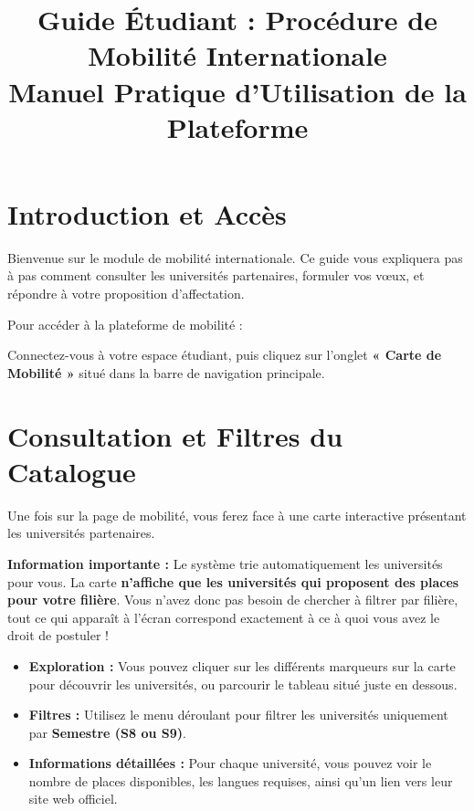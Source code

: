 \documentclass[12pt,a4paper]{article}
\title{\textbf{Guide Étudiant : Procédure de Mobilité Internationale}\\ \large Manuel Pratique d'Utilisation de la Plateforme}
\begin{document}
\maketitle
\tableofcontents
\newpage

\section{Introduction et Accès}
Bienvenue sur le module de mobilité internationale. Ce guide vous expliquera pas à pas comment consulter les universités partenaires, formuler vos vœux, et répondre à votre proposition d'affectation.

Pour accéder à la plateforme de mobilité :
\begin{tcolorbox}[colback=blue!5!white,colframe=blue!75!black,title=Accès au module]
Connectez-vous à votre espace étudiant, puis cliquez sur l'onglet \textbf{« Carte de Mobilité »} situé dans la barre de navigation principale.
\end{tcolorbox}

\section{Consultation et Filtres du Catalogue}
Une fois sur la page de mobilité, vous ferez face à une carte interactive présentant les universités partenaires.

\begin{tcolorbox}[colback=blue!5!white,colframe=blue!75!black,title=Affichage Automatique par Filière]
\textbf{Information importante :} Le système trie automatiquement les universités pour vous. La carte \textbf{n'affiche que les universités qui proposent des places pour votre filière}. Vous n'avez donc pas besoin de chercher à filtrer par filière, tout ce qui apparaît à l'écran correspond exactement à ce à quoi vous avez le droit de postuler !
\end{tcolorbox}

\begin{itemize}[leftmargin=*]
    \item \textbf{Exploration :} Vous pouvez cliquer sur les différents marqueurs sur la carte pour découvrir les universités, ou parcourir le tableau situé juste en dessous.
    \item \textbf{Filtres :} Utilisez le menu déroulant pour filtrer les universités uniquement par \textbf{Semestre (S8 ou S9)}.
    \item \textbf{Informations détaillées :} Pour chaque université, vous pouvez voir le nombre de places disponibles, les langues requises, ainsi qu'un lien vers leur site web officiel.
\end{itemize}
\end{document}
